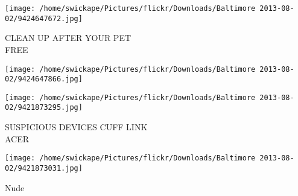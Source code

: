 \documentclass[10pt,letterpaper]{article}
\begin{document}
\vspace{0.25in}
\texttt{[image: /home/swickape/Pictures/flickr/Downloads/Baltimore 2013-08-02/9424647672.jpg]}

CLEAN UP AFTER YOUR PET\\
FREE
\pagebreak

\texttt{[image: /home/swickape/Pictures/flickr/Downloads/Baltimore 2013-08-02/9424647866.jpg]}

\vspace{0.25in}
\texttt{[image: /home/swickape/Pictures/flickr/Downloads/Baltimore 2013-08-02/9421873295.jpg]}

SUSPICIOUS DEVICES CUFF LINK\\
ACER
\pagebreak

\texttt{[image: /home/swickape/Pictures/flickr/Downloads/Baltimore 2013-08-02/9421873031.jpg]}

Nude
\pagebreak
\end{document}
